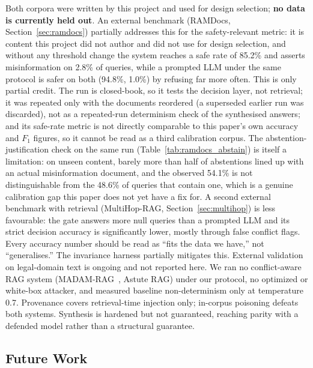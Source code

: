 \documentclass[conference]{IEEEtran}
\begin{document}
Both corpora were written by this project and used for design selection;
\textbf{no data is currently held out}. An external benchmark (RAMDocs,
Section~\ref{sec:ramdocs}) partially addresses this for the safety-relevant
metric: it is content this project did not author and did not use for design
selection, and without any threshold change the system reaches a safe rate
of 85.2\% and asserts misinformation on 2.8\% of queries, while a prompted
LLM under the same protocol is safer on both (94.8\%, 1.0\%) by refusing far
more often. This is only partial credit. The run is closed-book, so it
tests the decision layer, not retrieval; it was repeated only with the
documents reordered (a superseded earlier run was discarded), not as a
repeated-run determinism check of the synthesised answers;
and its safe-rate metric is not directly comparable to this paper's own
accuracy and $F_1$ figures, so it cannot be read as a third calibration
corpus. The abstention-justification check on the same run
(Table~\ref{tab:ramdocs_abstain}) is itself a limitation: on unseen content,
barely more than half of abstentions lined up with an actual misinformation document,
and the observed 54.1\% is not distinguishable from the 48.6\% of queries
that contain one, which is a genuine calibration gap this paper does not yet
have a fix for. A second external benchmark with retrieval (MultiHop-RAG,
Section~\ref{sec:multihop}) is less favourable: the gate answers more null
queries than a prompted LLM and its strict decision accuracy is significantly
lower, mostly through false conflict flags. Every accuracy number should be
read as ``fits the data we have,'' not ``generalises.'' The invariance
harness partially mitigates this. External validation on legal-domain
text is ongoing and not reported here. We ran no conflict-aware RAG system
(MADAM-RAG~\cite{wang2025ramdocs}, Astute RAG) under our protocol, no
optimized or white-box attacker, and measured baseline non-determinism only
at temperature 0.7. Provenance covers retrieval-time
injection only; in-corpus poisoning defeats both systems. Synthesis is
hardened but not guaranteed, reaching parity with a defended model
rather than a structural guarantee.

\subsection{Future Work}
\label{sec:future}
\end{document}

